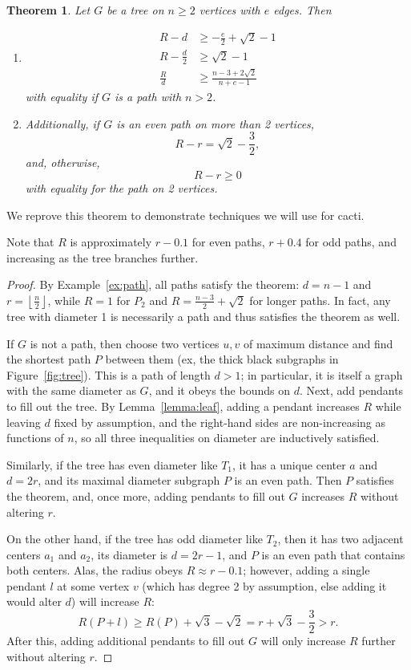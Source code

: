 \documentclass{amsart}
\newtheorem{thm}{Theorem}[section]%
\theoremstyle{definition}
\begin{document}
\begin{thm}\label{thm:tree_rd} Let $G$ be a tree on $n\geq 2$ vertices with $e$ edges. Then
\begin{enumerate}
\item\cite[Theorem]{yang2011randic}
\[\begin{split}
R - d &\geq -\frac{e}{2}+\sqrt 2 -1 \\
R - \frac{d}{2} &\geq \sqrt 2 - 1 \\
\frac{R}{d} &\geq \frac{n-3+2\sqrt 2}{n+e-1}
\end{split}\]
with equality if $G$ is a path with $n >2$. 
\item Additionally, if $G$ is an even path on more than 2 vertices,
\[R - r = \sqrt 2 - \frac{3}{2},\]
and, otherwise,
\[R - r \geq 0\]
with equality for the path on 2 vertices.
\end{enumerate}
\end{thm}

We reprove this theorem to demonstrate techniques we will use for cacti.


Note that $R$ is approximately $r - 0.1$ for even paths, $r + 0.4$ for odd paths, and increasing as the tree branches further.

\begin{proof}
By Example~\ref{ex:path}, all paths satisfy the theorem: $d=n-1$ and $r = \left\lfloor \frac{n}{2} \right\rfloor$, while $R = 1$ for $P_2$ and $R=\frac{n-3}{2} + \sqrt 2$ for longer paths. In fact, any tree with diameter 1 is necessarily a path and thus satisfies the theorem as well. 

If $G$ is not a path, then choose two vertices $u, v$ of maximum distance and find the shortest path $P$ between them (ex, the thick black subgraphs in Figure~\ref{fig:tree}). This is a path of length $d > 1$; in particular, it is itself a graph with the same diameter as $G$, and it obeys the bounds on $d$. Next, add pendants to fill out the tree. By Lemma~\ref{lemma:leaf}, adding a pendant increases $R$ while leaving $d$ fixed by assumption, and the right-hand sides are non-increasing as functions of $n$, so all three inequalities on diameter are inductively satisfied.

Similarly, if the tree has even diameter like $T_{1}$, it has a unique center $a$ and $d=2r$, and its maximal diameter subgraph $P$ is an even path. Then $P$ satisfies the theorem, and, once more, adding pendants to fill out $G$ increases $R$ without altering $r$. 

On the other hand, if the tree has odd diameter like $T_{2}$, then it has two adjacent centers $a_1$ and $a_2$, its diameter is $d=2r-1$, and $P$ is an even path that contains both centers. Alas, the radius obeys $R \approx r-0.1$; however, adding a single pendant $l$ at some vertex $v$ (which has degree 2 by assumption, else adding it would alter $d$) will increase $R$:
\[R(P + l) \geq R(P) + \sqrt 3 - \sqrt 2 = r + \sqrt 3 - \frac{3}{2} > r.\]
After this, adding additional pendants to fill out $G$ will only increase $R$ further without altering $r$.
\end{proof}
\end{document}
